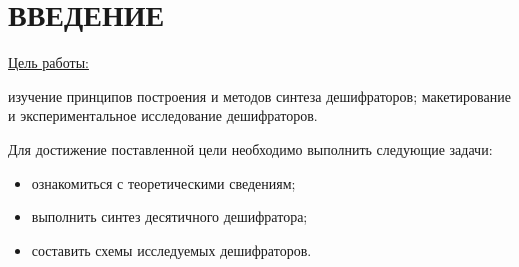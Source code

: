 \chapter*{ВВЕДЕНИЕ}

\underline{Цель работы:}

изучение принципов построения и методов синтеза дешифраторов;
макетирование и экспериментальное исследование дешифраторов.

Для достижение поставленной цели необходимо выполнить следующие задачи:

\begin{itemize}
	\item ознакомиться с
	теоретическими сведениям;
	\item выполнить синтез десятичного
	дешифратора;
	\item составить схемы исследуемых дешифраторов.
\end{itemize}